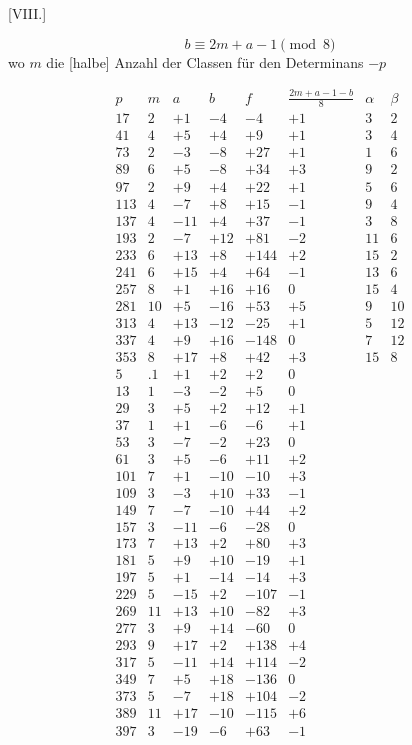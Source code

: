 %
\par\bigskip{}\centerline{[VIII.]}\medskip
\[
b\equiv2m+a-1\pmod8
\]
wo $m$ die [halbe] Anzahl der Classen für den Determinans $-p$

\begingroup\small
\[
\begin{array}{r|r|r|r|r|r|r|r}
p&m&a&b&f&\frac{2m+a-1-b}8&\alpha&\beta\\\hline
17&2&+1&-4&-4&+1&3&2\\
41&4&+5&+4&+9&+1&3&4\\
73&2&-3&-8&+27&+1&1&6\\
89&6&+5&-8&+34&+3&9&2\\
97&2&+9&+4&+22&+1&5&6\\
113&4&-7&+8&+15&-1&9&4\\
137&4&-11&+4&+37&-1&3&8\\
193&2&-7&+12&+81&-2&11&6\\
233&6&+13&+8&+144&+2&15&2\\
241&6&+15&+4&+64&-1&13&6\\
257&8&+1&+16&+16&0&15&4\\
281&10&+5&-16&+53&+5&9&10\\
313&4&+13&-12&-25&+1&5&12\\
337&4&+9&+16&-148&0&7&12\\
353&8&+17&+8&+42&+3&15&8\\
5&.1&+1&+2&+2&0&&\\
13&1&-3&-2&+5&0&&\\
29&3&+5&+2&+12&+1&&\\
37&1&+1&-6&-6&+1&&\\
53&3&-7&-2&+23&0&&\\
61&3&+5&-6&+11&+2&&\\
101&7&+1&-10&-10&+3&&\\
109&3&-3&+10&+33&-1&&\\
149&7&-7&-10&+44&+2&&\\
157&3&-11&-6&-28&0&&\\
173&7&+13&+2&+80&+3&&\\
181&5&+9&+10&-19&+1&&\\
197&5&+1&-14&-14&+3&&\\
229&5&-15&+2&-107&-1&&\\
269&11&+13&+10&-82&+3&&\\
277&3&+9&+14&-60&0&&\\
293&9&+17&+2&+138&+4&&\\
317&5&-11&+14&+114&-2&&\\
349&7&+5&+18&-136&0&&\\
373&5&-7&+18&+104&-2&&\\
389&11&+17&-10&-115&+6&&\\
397&3&-19&-6&+63&-1&&
\end{array}
\]
\endgroup
{}

